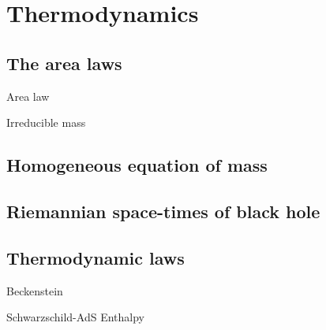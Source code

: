 \section{Thermodynamics}
\label{sec:thermod}

\subsection{The area laws}

Area law \cite{PhysRevLett.26.1344}

Irreducible mass \cite{PhysRevLett.25.1596}

\subsection{Homogeneous equation of mass}

\cite{PhysRevLett.30.71,PhysRevLett.30.521}

\subsection{Riemannian space-times of black hole}

\subsection{Thermodynamic laws}

Beckenstein \cite{PhysRevD.7.2333}

Schwarzschild-AdS \cite{Hawking1983} Enthalpy \cite{0264-9381-28-12-125020}